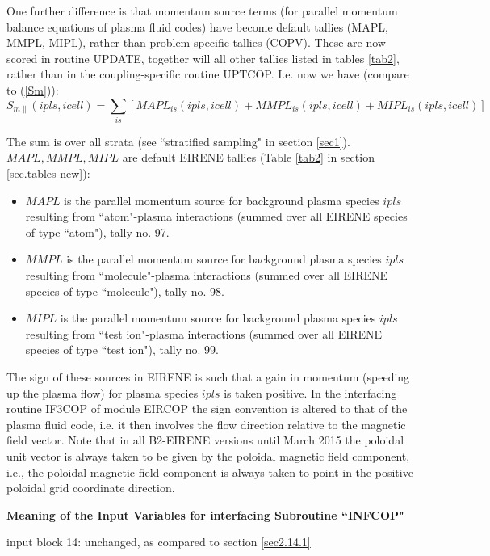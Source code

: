 One further difference is that momentum source terms (for parallel momentum balance equations of plasma fluid codes) have become default tallies (MAPL, MMPL, MIPL), rather than problem specific tallies (COPV). These are now scored in routine UPDATE, together will all other tallies listed in tables \ref{tab2}, rather than in the coupling-specific routine UPTCOP.
I.e. now we have (compare to (\ref{Sm})):
\begin{equation}
 S_{m\parallel}(ipls,icell) = \sum_{is} \left[MAPL_{is}(ipls,icell) + MMPL_{is}(ipls,icell) + MIPL_{is}(ipls,icell) \right]
 \end{equation}

 The sum is over all strata (see  ``stratified sampling" in section \ref{sec1}). $MAPL, MMPL,  MIPL$ are default EIRENE tallies (Table \ref{tab2} in section \ref{sec.tables-new}):
 \begin{itemize}
 \item
 $MAPL$ is the parallel momentum source for background plasma species $ipls$ resulting from ``atom"-plasma interactions (summed over all EIRENE species of type ``atom"), tally no. 97.
 \item
 $MMPL$ is the parallel momentum source for background plasma species $ipls$ resulting from ``molecule"-plasma interactions (summed over all EIRENE species of type ``molecule"), tally no. 98.
 \item
 $MIPL$ is the parallel momentum source for background plasma species $ipls$ resulting from ``test ion"-plasma interactions (summed over all EIRENE species of type ``test ion"), tally no. 99.
 \end{itemize}
 The sign of these sources in EIRENE is such that a gain in momentum (speeding up the plasma flow) for plasma species $ipls$ is taken positive. In the interfacing routine IF3COP of module EIRCOP the sign convention
 is altered to that of the plasma fluid code, i.e.
it then involves the flow direction relative to the magnetic field vector.
Note that in all B2-EIRENE versions
 until March 2015 the poloidal unit vector is always taken to be given
by the poloidal magnetic field component,
 i.e., the poloidal magnetic field component is always taken to point in
the positive poloidal grid coordinate direction.


{\bf Meaning of the Input Variables for interfacing Subroutine
``INFCOP"}

\medskip
input block 14: unchanged, as compared to section \ref{sec2.14.1}\\
\noindent

